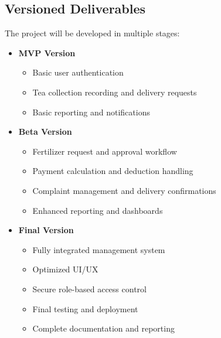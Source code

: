 \subsection{Versioned Deliverables}
The project will be developed in multiple stages:
\begin{itemize}
    \item \textbf{MVP Version}
    \begin{itemize}
        \item Basic user authentication
        \item Tea collection recording and delivery requests
        \item Basic reporting and notifications
    \end{itemize}
    \item \textbf{Beta Version}
    \begin{itemize}
        \item Fertilizer request and approval workflow
        \item Payment calculation and deduction handling
        \item Complaint management and delivery confirmations
        \item Enhanced reporting and dashboards
    \end{itemize}
    \item \textbf{Final Version}
    \begin{itemize}
        \item Fully integrated management system
        \item Optimized UI/UX
        \item Secure role-based access control
        \item Final testing and deployment
        \item Complete documentation and reporting
    \end{itemize}
\end{itemize}